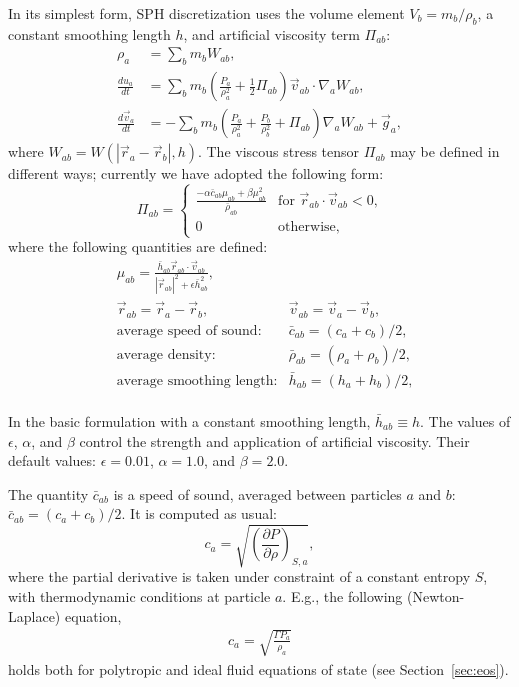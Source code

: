 \documentclass{article}
\begin{document}
In its simplest form, SPH discretization uses the volume element 
$V_b = m_b / \rho_b$, a constant smoothing length $h$, and artificial
viscosity term $\Pi_{ab}$:
\begin{align}
  \rho_a &= \sum_b m_b W_{ab}, 
\\
  \frac{d u_a}{dt}  
      &= \sum_b m_b\left( 
           \frac{P_a}{\rho_a^2} + \frac12\Pi_{ab}
         \right)\vec{v}_{ab} \cdot \nabla_a W_{ab},
\\
  \frac{d \vec{v}_a}{d t} &= -\sum_b m_b 
      \left( \frac{P_a}{\rho_a^2} 
           + \frac{P_b}{\rho_b^2} 
           + \Pi_{ab} \right) \nabla_a W_{ab}
       + \vec{g}_a,
\end{align}
where $W_{ab} = W(|\vec{r}_a - \vec{r}_b|,h)$.
The viscous stress tensor $\Pi_{ab}$ may be defined in different ways;
currently we have adopted the following form:
\begin{equation}
\Pi_{ab} = 
\begin{cases}
  \frac{- \alpha \bar{c}_{ab} \mu_{ab} + \beta \mu_{ab}^2}{\bar{\rho}_{ab}} 
    & \text{for $\vec{r}_{ab} \cdot \vec{v}_{ab} < 0$,} \\
  0 & \text{otherwise,}
\end{cases}
\end{equation}
where the following quantities are defined: 
\begin{align}
  &\mu_{ab} = \frac{\bar{h}_{ab} \vec{r}_{ab} \cdot \vec{v}_{ab}}
                   {|\vec{r}_{ab}|^2 + \epsilon \bar{h}_{ab}^2},\\
  &\vec{r}_{ab} = \vec{r}_a - \vec{r}_b, &\vec{v}_{ab} = \vec{v}_a - \vec{v}_b,\\
  &\text{average speed of sound:} &\bar{c}_{ab} = (c_a + c_b)/2, \\
  &\text{average density:}        &\bar{\rho}_{ab} = (\rho_a + \rho_b)/2,\\
  &\text{average smoothing length:} &\bar{h}_{ab} = (h_a + h_b)/2,\\
\end{align}

In the basic formulation with a constant smoothing length, $\bar{h}_{ab}\equiv h$.
The values of $\epsilon$, $\alpha$, and $\beta$ control the strength and
application of artificial viscosity. Their default values:
$\epsilon = 0.01$, $\alpha = 1.0$, and $\beta = 2.0$.

The quantity $\bar{c}_{ab}$ is a speed of sound, averaged between particles
$a$ and $b$: $\bar{c}_{ab} = (c_a + c_b)/2$. It is computed as usual:
\begin{equation}
c_a = \sqrt{\left(\frac{\partial P}{\partial \rho}\right)_{S,a}},
\end{equation}
where the partial derivative is taken under constraint of a constant entropy
$S$, with thermodynamic conditions at particle $a$.
E.g., the following (Newton-Laplace) equation,
\begin{align}
  c_a = \sqrt{\frac{\Gamma P_a}{\rho_a}}
\end{align}
holds both for polytropic and ideal fluid equations of state (see
Section~\ref{sec:eos}).
\end{document}
